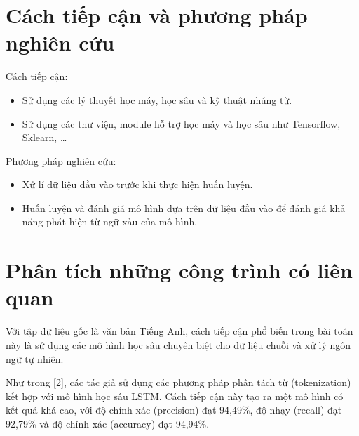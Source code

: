 \section{Cách tiếp cận và phương pháp nghiên cứu}
Cách tiếp cận:
\begin{itemize}
    \item Sử dụng các lý thuyết học máy, học sâu và kỹ thuật nhúng từ.
    \item Sử dụng các thư viện, module hỗ trợ học máy và học sâu như Tensorflow, Sklearn, \dots
\end{itemize}

Phương pháp nghiên cứu:
\begin{itemize}
    \item Xử lí dữ liệu đầu vào trước khi thực hiện huấn luyện.
    \item Huấn luyện và đánh giá mô hình dựa trên dữ liệu đầu vào để đánh giá khả năng phát hiện từ ngữ xấu của mô hình.
\end{itemize}

\section{Phân tích những công trình có liên quan}


Với tập dữ liệu gốc là văn bản Tiếng Anh, cách tiếp cận phổ biến trong bài toán này là sử dụng các mô hình học sâu chuyên biệt cho dữ liệu chuỗi và xử lý ngôn ngữ tự nhiên.

Như trong [2], các tác giả sử dụng các phương pháp phân tách từ (tokenization) kết hợp với mô hình học sâu LSTM. Cách tiếp cận này tạo ra một mô hình có kết quả khá cao, với độ chính xác (precision) đạt 94,49\%, độ nhạy (recall) đạt 92,79\% và độ chính xác (accuracy) đạt 94,94\%. 

